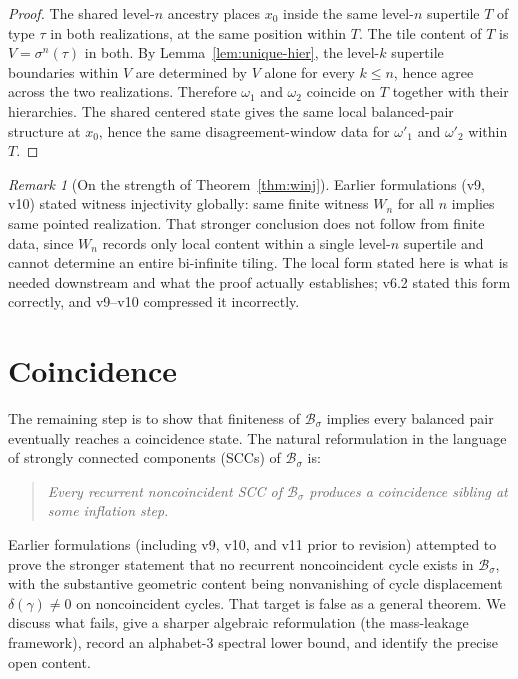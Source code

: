 \documentclass[11pt]{article}
\theoremstyle{plain}
\theoremstyle{definition}
\theoremstyle{remark}
\newtheorem{remark}[theorem]{Remark}
\newcommand{\B}{\mathcal{B}}
\begin{document}
\begin{proof}
The shared level-$n$ ancestry places $x_0$ inside the same level-$n$ supertile $T$ of type $\tau$ in both realizations, at the same position within $T$. The tile content of $T$ is $V=\sigma^n(\tau)$ in both. By Lemma~\ref{lem:unique-hier}, the level-$k$ supertile boundaries within $V$ are determined by $V$ alone for every $k\le n$, hence agree across the two realizations. Therefore $\omega_1$ and $\omega_2$ coincide on $T$ together with their hierarchies. The shared centered state gives the same local balanced-pair structure at $x_0$, hence the same disagreement-window data for $\omega'_1$ and $\omega'_2$ within $T$.
\end{proof}

\begin{remark}[On the strength of Theorem~\ref{thm:winj}]\label{rem:winj-history}
Earlier formulations (v9, v10) stated witness injectivity globally: same finite witness $W_n$ for all $n$ implies same pointed realization. That stronger conclusion does not follow from finite data, since $W_n$ records only local content within a single level-$n$ supertile and cannot determine an entire bi-infinite tiling. The local form stated here is what is needed downstream and what the proof actually establishes; v6.2 stated this form correctly, and v9--v10 compressed it incorrectly.
\end{remark}

\section{Coincidence}\label{sec:coincidence}

The remaining step is to show that finiteness of $\B_\sigma$ implies every balanced pair eventually reaches a coincidence state. The natural reformulation in the language of strongly connected components (SCCs) of $\B_\sigma$ is:

\begin{quote}
\emph{Every recurrent noncoincident SCC of $\B_\sigma$ produces a coincidence sibling at some inflation step.}
\end{quote}

Earlier formulations (including v9, v10, and v11 prior to revision) attempted to prove the stronger statement that no recurrent noncoincident cycle exists in $\B_\sigma$, with the substantive geometric content being nonvanishing of cycle displacement $\delta(\gamma)\ne 0$ on noncoincident cycles. That target is false as a general theorem. We discuss what fails, give a sharper algebraic reformulation (the mass-leakage framework), record an alphabet-$3$ spectral lower bound, and identify the precise open content.
\end{document}
